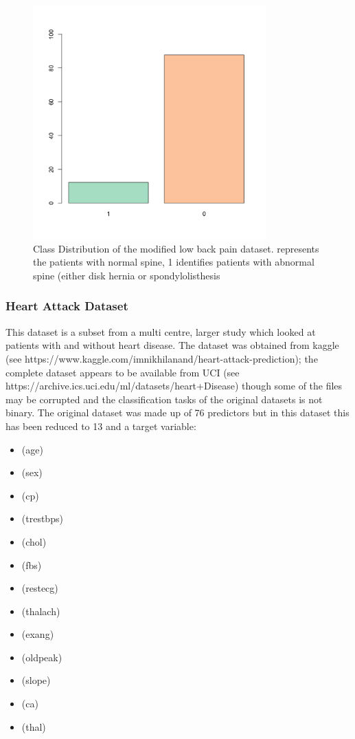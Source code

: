 \begin{figure}[H]
    \centering
    \includegraphics[width=0.8\textwidth]{ThesisTemplate/usingLatex/chapter4Images/figure4_14.png}
    \caption{Class Distribution of the modified low back pain dataset. represents the patients with normal spine, 1 identifies patients with abnormal spine (either disk hernia or spondylolisthesis }
    \label{fig:my_label}
\end{figure}


\subsubsection{Heart Attack Dataset}

This dataset is a subset from a multi centre, larger study which looked at patients with and without heart disease. The dataset was obtained from kaggle (see https://www.kaggle.com/imnikhilanand/heart-attack-prediction); the complete dataset appears to be available from UCI (see https://archive.ics.uci.edu/ml/datasets/heart+Disease) though some of the files may be corrupted and the classification tasks of the original datasets is not binary.
The original dataset was made up of 76 predictors but in this dataset this has been reduced to 13 and a target variable:
\begin{itemize}
    \item (age) 
    \item (sex) 
    \item (cp) 
    \item (trestbps) 
    \item (chol) 
    \item (fbs) 
    \item (restecg) 
    \item (thalach) 
    \item (exang) 
    \item (oldpeak) 
    \item (slope) 
    \item (ca) 
    \item (thal) 
\end{itemize}

